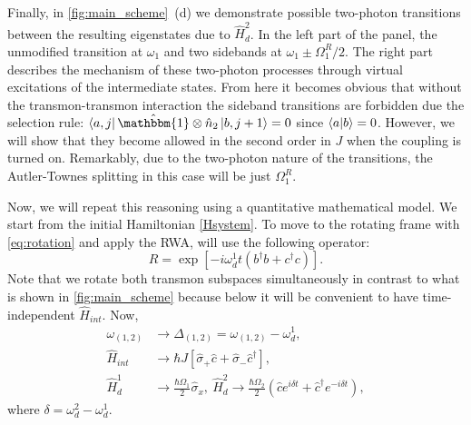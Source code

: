 \documentclass[%
 pra,
 amsmath,amssymb,
 reprint,%
]{revtex4-1}
\begin{document}
Finally, in \autoref{fig:main_scheme}~(d) we demonstrate possible two-photon transitions between the resulting eigenstates due to $\hat H_{d}^2$. In the left part of the panel, the unmodified transition at $\omega_1$ and two sidebands at $\omega_1 \pm \Omega_1^R/2$. The right part describes the mechanism of these two-photon processes through virtual excitations of the intermediate states. From here it becomes obvious that without the transmon-transmon interaction the sideband transitions are forbidden due the selection rule: $\bra{a,j}\hat{\mathbbm{1}}\otimes \hat n_2 \ket{b, j+1} = 0$ since $\braket{a}{b} = 0$. However, we will show that they become allowed in the second order in $J$ when the coupling is turned on.  Remarkably, due to the two-photon nature of the transitions, the Autler-Townes splitting in this case will be just $\Omega_1^R$.

Now, we will repeat this reasoning using a quantitative mathematical model. We start from the initial Hamiltonian \eqref{Hsystem}. To move to the rotating frame with \eqref{eq:rotation} and apply the RWA, will use the following operator:
\begin{equation}
R = \exp[-i\omega_d^1 t (b^{\dagger}b+c^{\dagger}c)].
\end{equation}  
Note that we rotate both transmon subspaces simultaneously in contrast to what is shown in \autoref{fig:main_scheme} because below it will be convenient to have time-independent $\hat H_{int}$. Now,
\begin{equation}
\begin{aligned}
\omega_{(1,2)} &\rightarrow \Delta_{(1,2)} = \omega_{(1,2)} - \omega_d^{1},\\
\hat H_{int} &\rightarrow  \hbar J \left[\hat \sigma_+ \hat c + \hat \sigma_-\hat c^\dag \right],\\
\hat H_{d}^1 &\rightarrow \frac{\hbar \Omega_1}{2} \hat \sigma_x,\ 
\hat H_{d}^2 \rightarrow \frac{\hbar \Omega_2}{2}(\hat c e^{i\delta t}  + \hat c^\dag e^{-i\delta t}),
\end{aligned}
\end{equation}
where $\delta = \omega_{d}^2 - \omega_{d}^1$.
\end{document}
